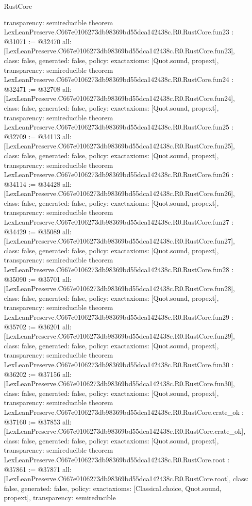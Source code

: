\begin{lexlean}{RustCore}
\begin{coremodule}
{  transparency: semireducible
}
theorem LexLeanPreserve.C667e0106273db98369bd55dca142438c.R0.RustCore.fun23 : @31071 := @32470 {
  all: [LexLeanPreserve.C667e0106273db98369bd55dca142438c.R0.RustCore.fun23],
  class: false,
  generated: false,
  policy: exact{axioms: [Quot.sound, propext]},
  transparency: semireducible
}
theorem LexLeanPreserve.C667e0106273db98369bd55dca142438c.R0.RustCore.fun24 : @32471 := @32708 {
  all: [LexLeanPreserve.C667e0106273db98369bd55dca142438c.R0.RustCore.fun24],
  class: false,
  generated: false,
  policy: exact{axioms: [Quot.sound, propext]},
  transparency: semireducible
}
theorem LexLeanPreserve.C667e0106273db98369bd55dca142438c.R0.RustCore.fun25 : @32709 := @34113 {
  all: [LexLeanPreserve.C667e0106273db98369bd55dca142438c.R0.RustCore.fun25],
  class: false,
  generated: false,
  policy: exact{axioms: [Quot.sound, propext]},
  transparency: semireducible
}
theorem LexLeanPreserve.C667e0106273db98369bd55dca142438c.R0.RustCore.fun26 : @34114 := @34428 {
  all: [LexLeanPreserve.C667e0106273db98369bd55dca142438c.R0.RustCore.fun26],
  class: false,
  generated: false,
  policy: exact{axioms: [Quot.sound, propext]},
  transparency: semireducible
}
theorem LexLeanPreserve.C667e0106273db98369bd55dca142438c.R0.RustCore.fun27 : @34429 := @35089 {
  all: [LexLeanPreserve.C667e0106273db98369bd55dca142438c.R0.RustCore.fun27],
  class: false,
  generated: false,
  policy: exact{axioms: [Quot.sound, propext]},
  transparency: semireducible
}
theorem LexLeanPreserve.C667e0106273db98369bd55dca142438c.R0.RustCore.fun28 : @35090 := @35701 {
  all: [LexLeanPreserve.C667e0106273db98369bd55dca142438c.R0.RustCore.fun28],
  class: false,
  generated: false,
  policy: exact{axioms: [Quot.sound, propext]},
  transparency: semireducible
}
theorem LexLeanPreserve.C667e0106273db98369bd55dca142438c.R0.RustCore.fun29 : @35702 := @36201 {
  all: [LexLeanPreserve.C667e0106273db98369bd55dca142438c.R0.RustCore.fun29],
  class: false,
  generated: false,
  policy: exact{axioms: [Quot.sound, propext]},
  transparency: semireducible
}
theorem LexLeanPreserve.C667e0106273db98369bd55dca142438c.R0.RustCore.fun30 : @36202 := @37156 {
  all: [LexLeanPreserve.C667e0106273db98369bd55dca142438c.R0.RustCore.fun30],
  class: false,
  generated: false,
  policy: exact{axioms: [Quot.sound, propext]},
  transparency: semireducible
}
theorem LexLeanPreserve.C667e0106273db98369bd55dca142438c.R0.RustCore.crate_ok : @37160 := @37853 {
  all: [LexLeanPreserve.C667e0106273db98369bd55dca142438c.R0.RustCore.crate_ok],
  class: false,
  generated: false,
  policy: exact{axioms: [Quot.sound, propext]},
  transparency: semireducible
}
theorem LexLeanPreserve.C667e0106273db98369bd55dca142438c.R0.RustCore.root : @37861 := @37871 {
  all: [LexLeanPreserve.C667e0106273db98369bd55dca142438c.R0.RustCore.root],
  class: false,
  generated: false,
  policy: exact{axioms: [Classical.choice, Quot.sound, propext]},
  transparency: semireducible
}


\end{coremodule}
\end{lexlean}
